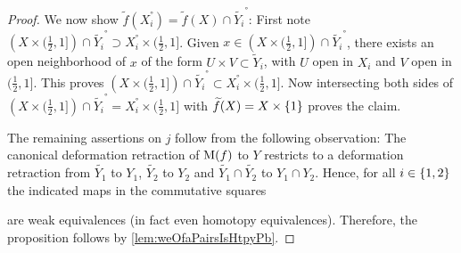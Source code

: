 \begin{lemma}
\begin{proof}
        We now show $\widetilde{f}(X_i^°)=\widetilde{f}(X)\cap \widetilde{Y_i}^°$: 
        First note $\left(X\times(\frac{1}{2},1]\right)\cap\widetilde{Y_i}^°\supset X_i^°\times(\frac{1}{2},1]$.
        Given $x\in\left(X\times(\frac{1}{2},1]\right)\cap\widetilde{Y_i}^°$, there exists an open neighborhood of $x$ of the form $U\times V\subset \widetilde{Y}_i$, with $U$ open in $X_i$ and $V$ open in $(\frac{1}{2},1]$.
        This proves $\left(X\times(\frac{1}{2},1]\right)\cap\widetilde{Y_i}^°\subset X_i^°\times(\frac{1}{2},1]$.
        Now intersecting both sides of $\left(X\times(\frac{1}{2},1]\right)\cap\widetilde{Y_i}^°= X_i^°\times(\frac{1}{2},1]$ with $\widetilde{f}(X)=X\times\left\lbrace1\right\rbrace$ proves the claim.

        The remaining assertions on $j$ follow from the following observation: 
        The canonical deformation retraction of $\operatorname{M}(f)$ to $Y$ restricts to a deformation retraction from $\widetilde{Y_1}$ to $Y_1$, $\widetilde{Y_2}$ to $Y_2$ and $\widetilde{Y_1}\cap\widetilde{Y_2}$ to $Y_1\cap Y_2$.
        Hence, for all $i\in\left\lbrace1,2\right\rbrace$ the indicated maps in the commutative squares
        \begin{center} 
        \end{center} 
        are weak equivalences (in fact even homotopy equivalences).
        Therefore, the proposition follows by \cref{lem:weOfaPairsIsHtpyPb}.
    \end{proof}
\end{lemma}
